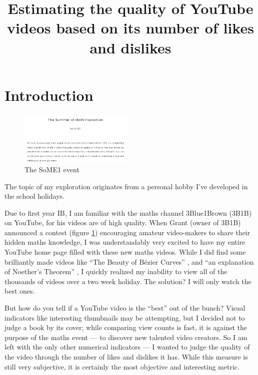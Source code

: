 \documentclass[a4paper,11pt]{article}
\title{\vspace{-8ex}Estimating the quality of YouTube videos based on its number of likes and dislikes}
\author{}
\date{\vspace{-8ex}}
\begin{document}



\maketitle

\section{Introduction}

\begin{figure}
    \centering
    \includegraphics[width=0.48\textwidth]{assets/som1.png}
    \caption{The SoME1 event}
    \label{fig:some1}
\end{figure}

The topic of my exploration originates from a personal hobby I've developed in the school holidays.

Due to first year IB, I am familiar with the maths channel 3Blue1Brown (3B1B) on YouTube, for his videos are of high quality. When Grant (owner of 3B1B) announced a contest (figure \ref{fig:some1}) \parencite{sanderson} encouraging amateur video-makers to share their hidden maths knowledge, I was understandably very excited to have my entire YouTube home page filled with these new maths videos. While I did find some brilliantly made videos like ``The Beauty of B\'{e}zier Curves'' \parencite{holmer_2021}, and ``an explanation of Noether's Theorem'' \parencite{m_2021}, I quickly realized my inability to view all of the thousands of videos over a two week holiday. The solution? I will only watch the best ones.

But how do you tell if a YouTube video is the ``best'' out of the bunch? Visual indicators like interesting thumbnails may be attempting, but I decided not to judge a book by its cover; while comparing view counts is fast, it is against the purpose of the maths event --- to discover new talented video creators. So I am left with the only other numerical indicators --- I wanted to judge the quality of the video through the number of likes and dislikes it has. While this measure is still very subjective, it is certainly the most objective and interesting metric.
\end{document}
